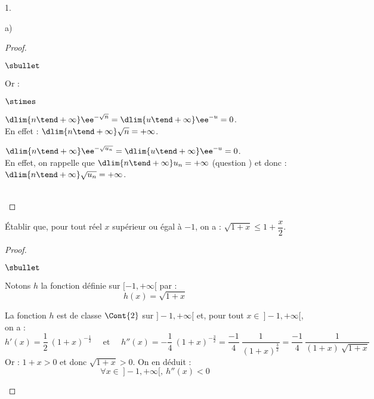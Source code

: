 \begin{noliste}{1.}
\begin{noliste}{a)}
\begin{proof}
\begin{noliste}{$\sbullet$}
      \item Or :
       \begin{noliste}{$\stimes$}
       \item $\dlim{n \tend +\infty} \ee^{-\sqrt{n}} = \dlim{u \tend
           +\infty} \ee^{-u} = 0$.\\[.1cm]
         En effet : $\dlim{n \tend +\infty} \sqrt{n} = +\infty$. 
       \item $\dlim{n \tend +\infty} \ee^{-\sqrt{u_n}} = \dlim{u \tend
           +\infty} \ee^{-u} = 0$.\\[.1cm]
         En effet, on rappelle que $\dlim{n \tend +\infty} u_n =
         +\infty$ (question ) et donc : $\dlim{n \tend
           +\infty} \sqrt{u_n} = +\infty$.
       \end{noliste}
     \end{noliste}
     ~\\[-1.2cm]
    \end{proof}

  \item Établir que, pour tout réel $x$ supérieur ou égal à $-1$, on a
    : $\sqrt{1 + x} \leq 1 + \dfrac{x}{2}$.

    \begin{proof}~%
      \begin{noliste}{$\sbullet$}
      \item Notons $h$ la fonction définie sur $[-1,+\infty[$ par :
        \[
        h(x) = \sqrt{1+x}
        \]

      \item La fonction $h$ est de classe $\Cont{2}$ sur
        $]-1,+\infty[$ et, pour tout $x\in \ ]-1,+\infty[$, on a :
        \[
        h'(x) = \dfrac{1}{2} \ (1+x)^{-\frac{1}{2}}
        \quad \text{ et } \quad h''(x) = -\dfrac{1}{4} \
        (1+x)^{-\frac{3}{2}} = \dfrac{-1}{4} \
        \dfrac{1}{(1+x)^{\frac{3}{2}}} = \dfrac{-1}{4} \
        \dfrac{1}{(1+x) \ \sqrt{1+x}}
        \]
        Or : $1+x > 0$ et donc $\sqrt{1+x} > 0$. On en déduit :
        \[
        \forall x \in \ ]-1,+\infty[, \ h''(x)<0
        \]


\end{noliste}
\end{proof}
\end{noliste}
\end{noliste}
